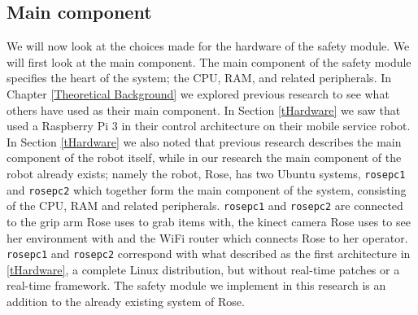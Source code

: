 \documentclass[12pt]{scrreprt}
\begin{document}
\subsection{Main component}
\label{Main component}
We will now look at the choices made for the hardware of the safety module. We will first look at the main component. The main component of the safety module specifies the heart of the system; the CPU, RAM, and related peripherals. In Chapter \ref{Theoretical Background} we explored previous research to see what others have used as their main component. In Section \ref{tHardware} we saw that \citeauthor{delgado} used a Raspberry Pi 3 in their control architecture on their mobile service robot. In Section  \ref{tHardware} we also noted that previous research describes the main component of the robot itself, while in our research the main component of the robot already exists; namely the robot, Rose, has two Ubuntu systems, \texttt{rosepc1} and \texttt{rosepc2} which together form the main component of the system, consisting of the CPU, RAM and related peripherals. \texttt{rosepc1} and \texttt{rosepc2} are connected to the grip arm Rose uses to grab items with, the kinect camera Rose uses to see her environment with and the WiFi router which connects Rose to her operator. \texttt{rosepc1} and \texttt{rosepc2} correspond with what \citeauthor{bouchier} described as the first architecture in \ref{tHardware}, a complete Linux distribution, but without real-time patches or a real-time framework. The safety module we implement in this research is an addition to the already existing system of Rose.\\
\end{document}

